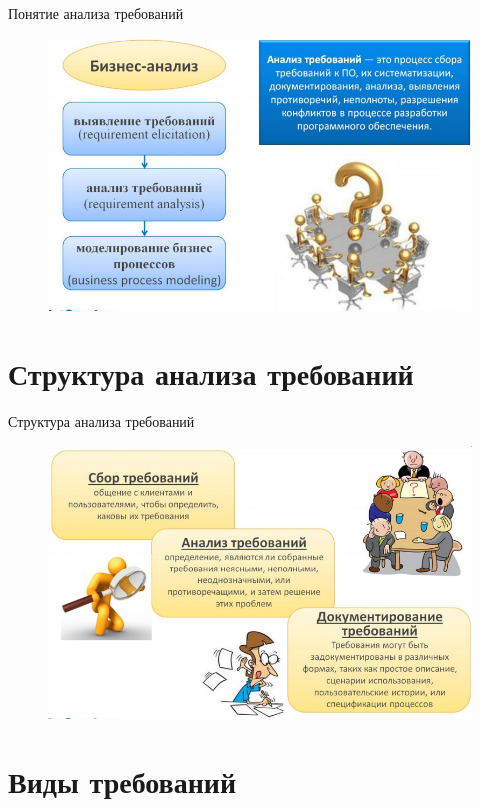 \documentclass{beamer}
\begin{document}
\begin{frame}[t]{Понятие анализа требований}
\begin{figure}[h]
\centering
\includegraphics[scale=0.5]{images/lec02-pic02.png}
\end{figure}
\end{frame} 
   
\section{Структура анализа требований}
   
\begin{frame}[t]{Структура анализа требований}
\begin{figure}[h]
\centering
\includegraphics[scale=0.5]{images/lec02-pic03.png}
\end{figure}
\end{frame} 

\section{Виды требований}
\end{document}
